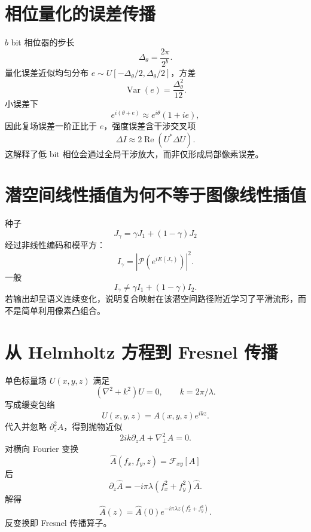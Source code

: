 \documentclass[UTF8,12pt,a4paper,fontset=none]{ctexart}
\numberwithin{equation}{section}
\begin{document}
\section{相位量化的误差传播}
$b$ bit 相位器的步长
\begin{equation}
 \Delta_\theta=\frac{2\pi}{2^b}.
\end{equation}
量化误差近似均匀分布 $e\sim U[-\Delta_\theta/2,\Delta_\theta/2]$，方差
\begin{equation}
 \operatorname{Var}(e)=\frac{\Delta_\theta^2}{12}.
\end{equation}
小误差下
\begin{equation}
 e^{i(\theta+e)}\approx e^{i\theta}(1+ie),
\end{equation}
因此复场误差一阶正比于 $e$，强度误差含干涉交叉项
\begin{equation}
 \Delta I\approx2\operatorname{Re}(U^*\Delta U).
\end{equation}
这解释了低 bit 相位会通过全局干涉放大，而非仅形成局部像素误差。

\section{潜空间线性插值为何不等于图像线性插值}
种子
\begin{equation}
 J_\gamma=\gamma J_1+(1-\gamma)J_2
\end{equation}
经过非线性编码和模平方：
\begin{equation}
 I_\gamma=|\mathcal P(e^{iE(J_\gamma)})|^2.
\end{equation}
一般
\begin{equation}
 I_\gamma\ne\gamma I_1+(1-\gamma)I_2.
\end{equation}
若输出却呈语义连续变化，说明复合映射在该潜空间路径附近学习了平滑流形，而不是简单利用像素凸组合。

\section{从 Helmholtz 方程到 Fresnel 传播}
单色标量场 $U(x,y,z)$ 满足
\begin{equation}
 (\nabla^2+k^2)U=0,
 \qquad k=2\pi/\lambda.
\end{equation}
写成缓变包络
\begin{equation}
 U(x,y,z)=A(x,y,z)e^{ikz}.
\end{equation}
代入并忽略 $\partial_z^2A$，得到抛物近似
\begin{equation}
 2ik\partial_zA+\nabla_\perp^2A=0.
\end{equation}
对横向 Fourier 变换
\begin{equation}
 \widehat A(f_x,f_y,z)=\mathcal F_{xy}[A]
\end{equation}
后
\begin{equation}
 \partial_z\widehat A
 =-i\pi\lambda(f_x^2+f_y^2)\widehat A.
\end{equation}
解得
\begin{equation}
 \widehat A(z)=\widehat A(0)
 e^{-i\pi\lambda z(f_x^2+f_y^2)}.
\end{equation}
反变换即 Fresnel 传播算子。
\end{document}

